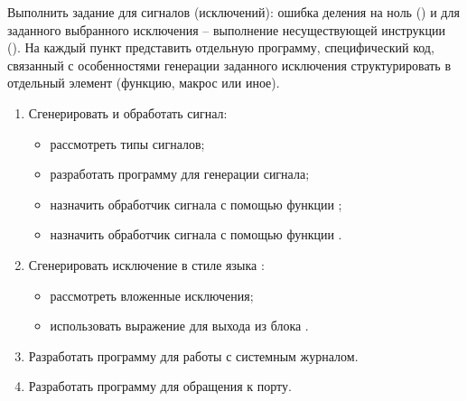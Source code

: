 \renewcommand{\labelenumii}{\theenumii}
\renewcommand{\theenumii}{\theenumi.\arabic{enumii}.}

Выполнить задание для сигналов (исключений): ошибка деления на ноль () и для заданного выбранного исключения -- выполнение несуществующей инструкции (). На каждый пункт представить отдельную программу, специфический код, связанный с особенностями генерации заданного исключения структурировать в отдельный элемент (функцию, макрос или иное).

\begin{enumerate}
	\item Сгенерировать и обработать сигнал:
	\begin{itemize}
		\item рассмотреть типы сигналов;
		\item разработать программу для генерации сигнала;
		\item назначить обработчик сигнала с помощью функции ;
		\item назначить обработчик сигнала с помощью функции .
	\end{itemize}
	\item Сгенерировать исключение в стиле языка :
	\begin{itemize}
		\item рассмотреть вложенные исключения;
		\item использовать выражение  для выхода из блока .
	\end{itemize}
	\item Разработать программу для работы с системным журналом.
	\item Разработать программу для обращения к порту.
\end{enumerate}
